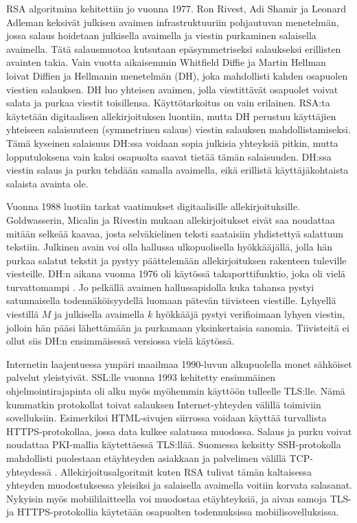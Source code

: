 \documentclass[finnish]{tktltiki2}
\theoremstyle{definition}
\theoremstyle{remark}
\begin{document}
RSA algoritmina kehitettiin jo vuonna 1977. Ron Rivest, Adi Shamir ja Leonard Adleman \cite{rsa78} keksivät julkisen avaimen infrastruktuuriin pohjautuvan menetelmän, jossa salaus hoidetaan julkisella avaimella ja viestin purkaminen salaisella avaimella. Tätä salausmuotoa kutsutaan epäsymmetriseksi salaukseksi erillisten avainten takia. Vain vuotta aikaisemmin Whitfield Diffie ja Martin Hellman \cite{dh76} loivat Diffien ja Hellmanin menetelmän (DH), joka mahdollisti kahden osapuolen viestien salauksen. DH luo yhteisen avaimen, jolla viestittävät osapuolet voivat salata ja purkaa viestit toisillensa. Käyttötarkoitus on vain erilainen. RSA:ta käytetään digitaalisen allekirjoituksen luontiin, mutta DH perustuu käyttäjien yhteiseen salaisuuteen (symmetrinen salaus) viestin salauksen mahdollistamiseksi. Tämä kyseinen salaisuus DH:ssa voidaan sopia julkisia yhteyksiä pitkin, mutta lopputuloksena vain kaksi osapuolta saavat tietää tämän salaisuuden. DH:ssa viestin salaus ja purku tehdään samalla avaimella, eikä erillistä käyttäjäkohtaista salaista avainta ole.

Vuonna 1988 luotiin tarkat vaatimukset digitaalisille allekirjoituksille. Goldwasserin, Micalin ja Rivestin \cite{siam} mukaan allekirjoitukset eivät saa noudattaa mitään selkeää kaavaa, josta selväkielinen teksti saataisiin yhdistettyä salattuun tekstiin. Julkinen avain voi olla hallussa ulkopuolisella hyökkääjällä, jolla hän purkaa salatut tekstit ja pystyy päättelemään allekirjoituksen rakenteen tuleville viesteille. DH:n aikana vuonna 1976 oli käytössä takaporttifunktio, joka oli vielä turvattomampi \cite{dh76}. Jo pelkällä avaimen hallussapidolla kuka tahansa pystyi satunnaisella todennäköisyydellä luomaan pätevän tiivisteen viestille. Lyhyellä viestillä $M$ ja julkisella avaimella $k$ hyökkääjä pystyi verifioimaan lyhyen viestin, jolloin hän pääsi lähettämään ja purkamaan yksinkertaisia sanomia. Tiivisteitä ei ollut siis DH:n ensimmäisessä versiossa vielä käytössä.

Internetin laajentuessa ympäri maailmaa 1990-luvun alkupuolella monet sähköiset palvelut yleistyivät. SSL:lle vuonna 1993 kehitetty ensimmäinen ohjelmointirajapinta oli alku myös myöhemmin käyttöön tulleelle TLS:lle. Nämä kummatkin protokollat toivat salauksen Internet-yhteyden välillä toimiviin sovelluksiin. Esimerkiksi HTML-sivujen siirrossa voidaan käyttää turvallista HTTPS-protokollaa, jossa data kulkee salatussa muodossa. Salaus ja purku voivat noudattaa PKI-mallia käytettäessä TLS:llää. Suomessa keksitty SSH-protokolla mahdollisti puolestaan etäyhteyden asiakkaan ja palvelimen välillä TCP-yhteydessä \cite{bulk}. Allekirjoitusalgoritmit kuten RSA tulivat tämän kaltaisessa yhteyden muodostuksessa yleisiksi ja salaisella avaimella voitiin korvata salasanat. Nykyisin myös mobiililaitteella voi muodostaa etäyhteyksiä, ja aivan samoja TLS- ja HTTPS-protokollia käytetään osapuolten todennuksissa mobiilisovelluksissa.
\end{document}
